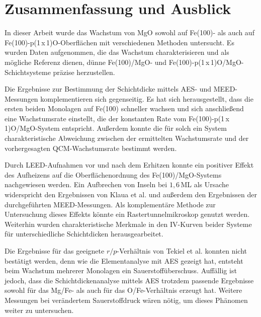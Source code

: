 \chapter{Zusammenfassung und Ausblick}

In dieser Arbeit wurde das Wachstum von MgO sowohl auf Fe(100)- als auch auf Fe(100)-p(1\,x\,1)O-Oberflächen
mit verschiedenen Methoden untersucht. 
Es wurden Daten aufgenommen, die das Wachstum charakterisieren und als mögliche Referenz dienen,
dünne Fe(100)/MgO- und Fe(100)-p(1\,x\,1)O/MgO-Schichtsysteme präzise herzustellen.
%

Die Ergebnisse zur Bestimmung der Schichtdicke mittels AES- und MEED-Messungen 
komplementieren sich gegenseitig.
Es hat sich herausgestellt, dass die ersten beiden Monolagen auf Fe(100) schneller 
wachsen und sich anschließend eine Wachstumsrate einstellt, die der konstanten Rate vom Fe(100)-p(1\,x\,1)O/MgO-System entspricht.\newline
Außerdem konnte die für solch ein System charakteristische Abweichung zwischen der ermittelten Wachstumsrate und der 
vorhergesagten QCM-Wachstumsrate bestimmt werden. 

Durch LEED-Aufnahmen vor und nach dem Erhitzen konnte ein positiver Effekt 
des Aufheizens auf die Oberflächenordnung des Fe(100)/MgO-Systems nachgewiesen werden.
Ein Aufbrechen von Inseln bei $1,6$\,ML als Ursache widerspricht den Ergebnissen von Klaua et al. \cite{klaua2001growth} und 
außerdem den Ergebnissen der durchgeführten MEED-Messungen. Als komplementäre Methode zur Untersuchung dieses Effekts 
könnte ein Rastertunnelmikroskop genutzt werden.\newline
Weiterhin wurden charakteristische Merkmale in den IV-Kurven beider Systeme 
für unterschiedliche Schichtdicken herausgearbeitet.

Die Ergebnisse für das geeignete $r/p$-Verhältnis von Tekiel et al. \cite{tekiel2013reactive} konnten nicht bestätigt werden,
denn wie die Elementanalyse mit AES gezeigt hat, entsteht beim Wachstum mehrerer Monolagen ein Sauerstoffüberschuss.\newline
Auffällig ist jedoch, dass die Schichtdickenanalyse mittels AES trotzdem passende Ergebnisse 
sowohl für das Mg/Fe- als auch für das O/Fe-Verhältnis erzeugt hat. 
Weitere Messungen bei verändertem Sauerstoffdruck wären nötig, um dieses Phänomen weiter zu untersuchen. 



